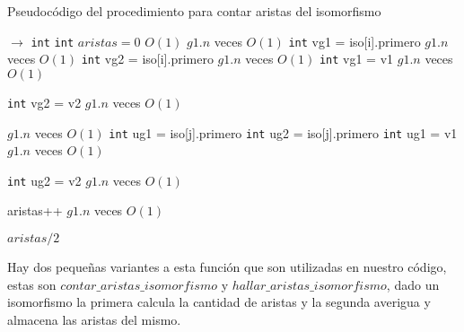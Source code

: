 \begin{algorithm}[H]
  \begin{algorithmic}[1]
  \caption{Pseudocódigo del procedimiento para contar aristas del isomorfismo}
  \label{algo:ap-3}
     $\rightarrow$ \texttt{int}
    \State \texttt{int} $aristas = 0$
    \Comment $O(1)$
        \Comment $g1.n$ veces $O(1)$
		\State \texttt{int} vg1 = iso[i].primero
		\Comment $g1.n$ veces $O(1)$
		\State \texttt{int} vg2 = iso[i].primero
		\Comment $g1.n$ veces $O(1)$
		 \Else
		 \State \texttt{int} vg1 = v1
		\Comment $g1.n$ veces $O(1)$

		 \State \texttt{int} vg2 = v2
		\Comment $g1.n$ veces $O(1)$

		 \EndIf 


        \Comment $g1.n$ veces $O(1)$
		\State \texttt{int} ug1 = iso[j].primero
		\State \texttt{int} ug2 = iso[j].primero
		 \Else
		 \State \texttt{int} ug1 = v1
		\Comment $g1.n$ veces $O(1)$

		 \State \texttt{int} ug2 = v2
		\Comment $g1.n$ veces $O(1)$

		 \EndIf 
		\State aristas++
		\Comment $g1.n$ veces $O(1)$
		\EndIf
	    \EndFor

    \EndFor
    \Return $aristas/2$

		\EndProcedure
	\end{algorithmic}
\end{algorithm}

Hay dos pequeñas variantes a esta función que son utilizadas en nuestro código, estas son $contar\_aristas\_isomorfismo$ y $hallar\_aristas\_isomorfismo$, dado un isomorfismo la primera calcula la cantidad de aristas y la segunda averigua y almacena las aristas del mismo.

